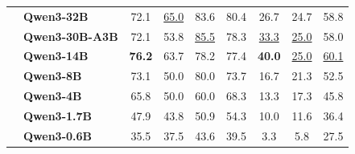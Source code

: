 \begin{table}[tbp]
{\begin{tabular}{clccccccc}
 & \textbf{Qwen3-32B} & 72.1 & \underline{65.0} & 83.6 & 80.4 & 26.7 & 24.7 & 58.8 \\
 & \textbf{Qwen3-30B-A3B} & 72.1 & 53.8 & \underline{85.5} & 78.3 & \underline{33.3} & \underline{25.0} & 58.0 \\
 & \textbf{Qwen3-14B} & \textbf{76.2} & 63.7 & 78.2 & 77.4 & \textbf{40.0} & \underline{25.0} & \underline{60.1} \\
 & \textbf{Qwen3-8B} & 73.1 & 50.0 & 80.0 & 73.7 & 16.7 & 21.3 & 52.5 \\
 & \textbf{Qwen3-4B} & 65.8 & 50.0 & 60.0 & 68.3 & 13.3 & 17.3 & 45.8 \\
 & \textbf{Qwen3-1.7B} & 47.9 & 43.8 & 50.9 & 54.3 & 10.0 & 11.6 & 36.4 \\
 & \textbf{Qwen3-0.6B} & 35.5 & 37.5 & 43.6 & 39.5 & 3.3 & 5.8 & 27.5 \\
\bottomrule
\end{tabular}
}
\end{table}

